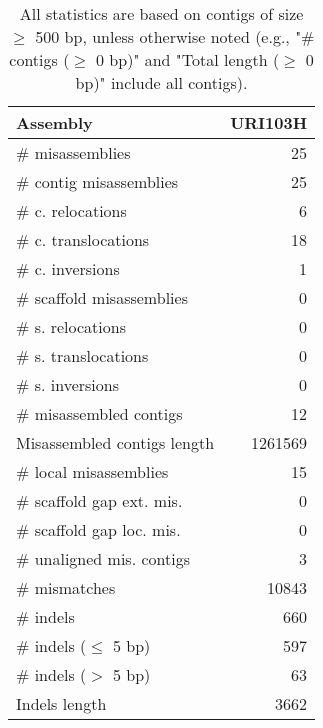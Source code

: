 \documentclass[12pt,a4paper]{article}
\begin{document}
\begin{table}[ht]
\begin{center}
\caption{All statistics are based on contigs of size $\geq$ 500 bp, unless otherwise noted (e.g., "\# contigs ($\geq$ 0 bp)" and "Total length ($\geq$ 0 bp)" include all contigs).}
\begin{tabular}{|l*{1}{|r}|}
\hline
Assembly & URI103H \\ \hline
\# misassemblies & 25 \\ \hline
\hspace{2mm}\# contig misassemblies & 25 \\ \hline
\hspace{5mm}\# c. relocations & 6 \\ \hline
\hspace{5mm}\# c. translocations & 18 \\ \hline
\hspace{5mm}\# c. inversions & 1 \\ \hline
\hspace{2mm}\# scaffold misassemblies & 0 \\ \hline
\hspace{5mm}\# s. relocations & 0 \\ \hline
\hspace{5mm}\# s. translocations & 0 \\ \hline
\hspace{5mm}\# s. inversions & 0 \\ \hline
\# misassembled contigs & 12 \\ \hline
Misassembled contigs length & 1261569 \\ \hline
\# local misassemblies & 15 \\ \hline
\# scaffold gap ext. mis. & 0 \\ \hline
\# scaffold gap loc. mis. & 0 \\ \hline
\# unaligned mis. contigs & 3 \\ \hline
\# mismatches & 10843 \\ \hline
\# indels & 660 \\ \hline
\hspace{5mm}\# indels ($\leq$ 5 bp) & 597 \\ \hline
\hspace{5mm}\# indels ($>$ 5 bp) & 63 \\ \hline
Indels length & 3662 \\ \hline
\end{tabular}
\end{center}
\end{table}
\end{document}
